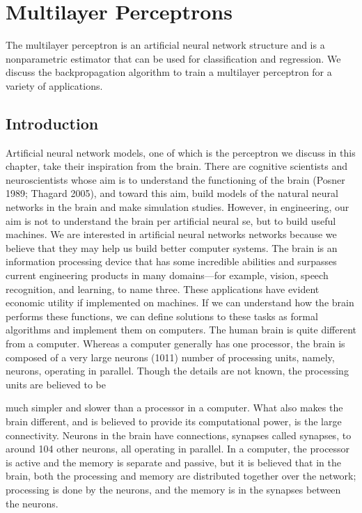 \chapter{Multilayer Perceptrons}
\label{chap:11-multilayer-perceptrons}

The multilayer perceptron is an artificial neural network structure and is a nonparametric estimator that can be used for classification and regression. We discuss the backpropagation algorithm to train a multilayer perceptron for a variety of applications.

\section{Introduction}

Artificial neural network models, one of which is the perceptron we discuss in this chapter, take their inspiration from the brain. There are cognitive scientists and neuroscientists whose aim is to understand the functioning of the brain (Posner 1989; Thagard 2005), and toward this aim, build models of the natural neural networks in the brain and make simulation studies. However, in engineering, our aim is not to understand the brain per artificial neural se, but to build useful machines. We are interested in artificial neural networks networks because we believe that they may help us build better computer systems. The brain is an information processing device that has some incredible abilities and surpasses current engineering products in many domains---for example, vision, speech recognition, and learning, to name three. These applications have evident economic utility if implemented on machines. If we can understand how the brain performs these functions, we can define solutions to these tasks as formal algorithms and implement them on computers. The human brain is quite different from a computer. Whereas a computer generally has one processor, the brain is composed of a very large neurons (1011) number of processing units, namely, neurons, operating in parallel. Though the details are not known, the processing units are believed to be

much simpler and slower than a processor in a computer. What also makes the brain different, and is believed to provide its computational power, is the large connectivity. Neurons in the brain have connections, synapses called synapses, to around 104 other neurons, all operating in parallel. In a computer, the processor is active and the memory is separate and passive, but it is believed that in the brain, both the processing and memory are distributed together over the network; processing is done by the neurons, and the memory is in the synapses between the neurons.

